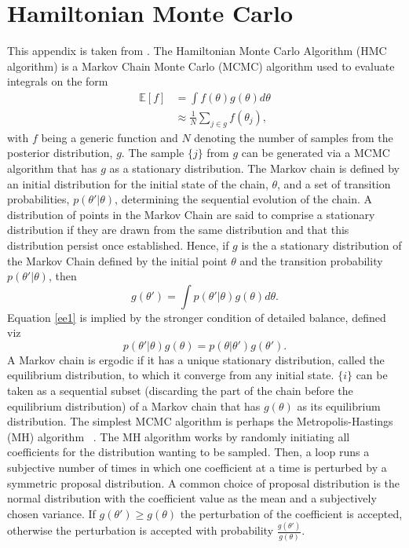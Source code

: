 \chapter{Hamiltonian Monte Carlo}
\label{app:HMC}
This appendix is taken from \citet{petersen2020}. The Hamiltonian Monte Carlo Algorithm (HMC algorithm) is a Markov Chain Monte Carlo (MCMC) algorithm used to evaluate integrals on the form
\begin{equation}
	\begin{split}
		\mathbb{E}[f] &= \int f(\theta)g(\theta)d\theta\\
		& \approx \frac{1}{N}\sum_{j\in g}f(\theta_j),
	\end{split}
\end{equation}
with $f$ being a generic function and $N$ denoting the number of samples from the posterior distribution, $g$. The sample $\{j\}$ from $g$ can be generated via a MCMC algorithm that has $g$ as a stationary distribution. The Markov chain is defined by an initial distribution for the initial state of the chain, $\theta$, and a set of transition probabilities, $p(\theta'|\theta)$, determining the sequential evolution of the chain. A distribution of points in the Markov Chain are said to comprise a stationary distribution if they are drawn from the same distribution and that this distribution persist once established. Hence, if $g$ is the a stationary distribution of the Markov Chain defined by the initial point $\theta$ and the transition probability $p(\theta'|\theta)$, then~\citep{Neal:1996}
\begin{equation}
	g(\theta')=\int p(\theta'|\theta)g(\theta)d\theta.
	\label{ee1}
\end{equation}
Equation \eqref{ee1} is implied by the stronger condition of detailed balance, defined viz
\begin{equation}
	p(\theta'|\theta)g(\theta)=p(\theta|\theta')g(\theta').
\end{equation}
A Markov chain is ergodic if it has a unique stationary distribution, called the equilibrium distribution, to which it converge from any initial state. $\{i\}$ can be taken as a sequential subset (discarding the part of the chain before the equilibrium distribution) of a Markov chain that has $g(\theta)$ as its equilibrium distribution. \newline
The simplest MCMC algorithm is perhaps the Metropolis-Hastings (MH) algorithm ~\citep{Metropolis1953,hastings70}. The MH algorithm works by randomly initiating all coefficients for the distribution wanting to be sampled. Then, a loop runs a subjective number of times in which one coefficient at a time is perturbed by a symmetric proposal distribution. A common choice of proposal distribution is the normal distribution with the coefficient value as the mean and a subjectively chosen variance. If $g(\theta')\geq g(\theta)$ the perturbation of the coefficient is accepted, otherwise the perturbation is accepted with probability $\frac{g(\theta')}{g(\theta)}$.\newline
